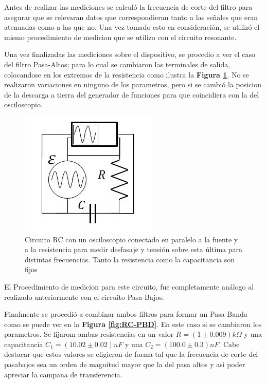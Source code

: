 \documentclass[11pt,a4paper]{article}
\begin{document}
Antes de realizar las mediciones se calculó la frecuencia de corte del filtro para asegurar que se relevaran datos que correspondieran tanto a las señales que eran atenuadas como a las que no. Una vez tomado esto en consideración, se utilizó el mismo procedimiento de medicion que se utilizo con el circuito resonante. 

Una vez finalizadas las mediciones sobre el dispositivo, se procedio a ver el caso del filtro Pasa-Altos; para lo cual se cambiaron las terminales de salida, colocandose en los extremos de la resistencia como ilustra la \textbf{Figura \ref{fig:RC-PA}}. No se realizaron variaciones en ninguno de los parametros, pero si se cambió la posicion de la descarga a tierra del generador de funciones para que coincidiera con la del osciloscopio.

\begin{figure}[h]
\centering
\includegraphics[scale=0.9]{Circuito-RC-Pasa-Altos}
  \caption{Circuito RC con un osciloscopio conectado en paralelo a la fuente y a la resistencia para medir desfasaje y tensión sobre esta última para distintas frecuencias. Tanto la resistencia como la capacitancia son fijos}
  \label{fig:RC-PA}
\end{figure}

El Procedimiento de medicion para este circuito, fue completamente análogo al realizado anteriormente con el circuito Pasa-Bajos. 

Finalmente se procedió a combinar ambos filtros para formar un Pasa-Banda como se puede ver en la \textbf{Figura \ref{fig:RC-PBD}}. En este caso si se cambiaron los parametros. Se fijarom ambas resistencias en un valor $R = (1 \pm 0.009)k\Omega$ y una capacitancia $C_{1} = (10.02 \pm 0.02)nF$ y una $C_{2} = (100.0 \pm 0.3)nF$. Cabe destacar que estos valores se eligieron de forma tal que la frecuencia de corte del pasabajos sea un orden de magnitud mayor que la del pasa altos y asi poder apreciar la campana de transferencia. 
\end{document}
